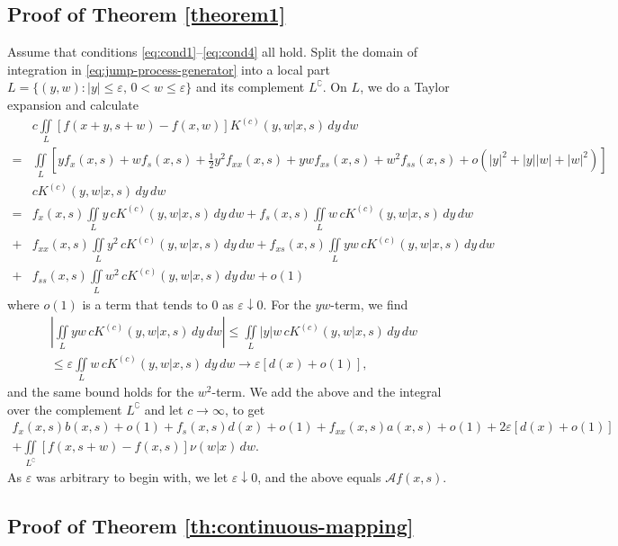 \documentclass[a4paper,12pt]{elsarticle}
\numberwithin{equation}{section}
\theoremstyle{plain}
\theoremstyle{definition}
\theoremstyle{remark}
\numberwithin{equation}{section}
\newcommand{\1}{\mathbf 1}
\begin{document}
\subsection{Proof of Theorem \ref{theorem1}}
\label{sec:app-pf-th}

Assume that conditions \eqref{eq:cond1}--\eqref{eq:cond4} all hold. 
Split the domain of integration in \eqref{eq:jump-process-generator} into a local part $L = \{(y,w): |y| \le \varepsilon, \, 0 < w \le \varepsilon\}$ and its complement $L^\complement$. On $L$, we do a Taylor expansion and calculate
\begin{align*}
&c \iint\limits_L [f(x+y, s+w) - f(x,w)] K^{(c)}(y,w|x,s)\,dy\,dw
\\
= &\iint\limits_L \left[y f_x(x,s)
+ w f_s(x,s)
+ \frac{1}{2} y^2 f_{xx}(x,s) 
+ yw f_{xs}(x,s) 
+ w^2 f_{ss}(x,s)
+ o(|y|^2 + |y||w| + |w|^2)\right]
\\
& c K^{(c)}(y,w | x,s) \,dy\,dw
\\
= &f_x(x,s) \iint\limits_L y \,cK^{(c)}(y,w|x,s)\,dy\,dw
+ f_s(x,s) \iint\limits_L w \,cK^{(c)}(y,w|x,s)\,dy\,dw
\\
+ &f_{xx}(x,s) \iint\limits_L y^2 \,cK^{(c)}(y,w|x,s)\,dy\,dw
+ f_{xs}(x,s) \iint\limits_L yw \,cK^{(c)}(y,w|x,s)\,dy\,dw
\\
+ &f_{ss}(x,s) \iint\limits_L w^2 \,cK^{(c)}(y,w|x,s)\,dy\,dw
+ o(1)
\end{align*}
where $o(1)$ is a term that tends to $0$ as $\varepsilon \downarrow 0$. 
For the $yw$-term, we find 
\begin{align*}
\left|\iint\limits_L yw \,cK^{(c)}(y,w|x,s)\,dy\,dw \right|
\le \iint\limits_L |y|w \,cK^{(c)}(y,w|x,s)\,dy\,dw
\\
\le \varepsilon \iint\limits_L w \,cK^{(c)}(y,w|x,s)\,dy\,dw
\to \varepsilon [d(x) + o(1)],
\end{align*}
and the same bound holds for the $w^2$-term. 
We add the above and the integral over the complement $L^\complement$ and let $c \to \infty$, to get
\begin{align*}
f_x(x,s) b(x,s) + o(1) + f_s(x,s) d(x) + o(1) + f_{xx}(x,s) a(x,s) + o(1) 
+ 2\varepsilon [d(x) + o(1)]
\\
+ \iint\limits_{L^\complement} [f(x, s+w) - f(x,s)] \nu(w|x)\,dw.
\end{align*}
As $\varepsilon$ was arbitrary to begin with, we let $\varepsilon \downarrow 0$, 
and the above equals $\mathcal A f(x,s)$. 

\subsection{Proof of Theorem \ref{th:continuous-mapping}}
\label{sec:app-pf-th2}
\end{document}
